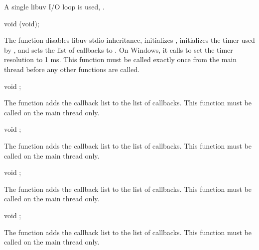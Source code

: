 A single libuv I/O loop is used, .

\begin{function}
  void (void);
\end{function}

The  function disables libuv stdio inheritance,
initializes , initializes the timer used by
, and sets the list of callbacks to
\code{()}. On Windows, it calls  to set the
timer resolution to 1 ms. This function must be called exactly once
from the main thread before any other  functions are
called.

\begin{function}
  void ;
\end{function}

The  function adds the callback list
 to the list of callbacks. This
function must be called on the main thread only.

\begin{function}
  void ;
\end{function}

The  function adds the callback list
 to the list of callbacks. This
function must be called on the main thread only.

\begin{function}
  void ;
\end{function}

The  function adds the callback list
 to the list of
callbacks. This function must be called on the main thread only.

\begin{function}
  void ;
\end{function}

The  function adds the callback list
 to the list
of callbacks. This function must be called on the main thread only.

